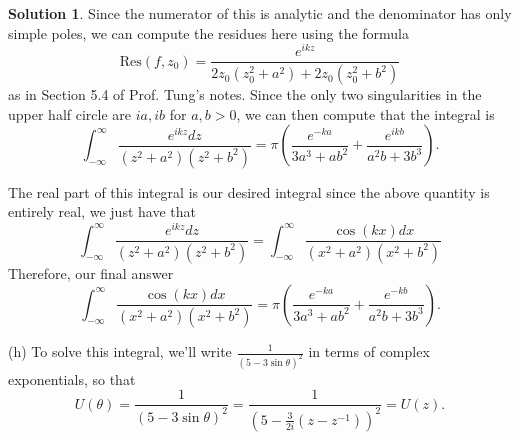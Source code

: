 \documentclass[12pt]{article}
\newcommand{\Res}{\text{Res}}
\theoremstyle{definition}
\newtheorem{sol}{Solution}
\theoremstyle{remark}
\begin{document}
\begin{sol}
Since the numerator of this is analytic and the denominator has only simple poles, we can compute the residues here using the formula
\begin{equation}
    \Res(f, z_0) = \frac{e^{ikz}}{2z_0(z_0^2 + a^2) + 2z_0 (z_0^2 + b^2)}
\end{equation}
as in Section 5.4 of Prof. Tung's notes. Since the only two singularities in the upper half circle are $ia, ib$ for $a,b>0$, we can then compute that the integral is
\begin{equation}
    \int_{-\infty}^{\infty} \frac{e^{ikz}dz}{(z^2+a^2)(z^2+b^2)} = \pi \left( \frac{e^{-ka}}{3a^3 + ab^2} + \frac{e^{ikb}}{a^2b +3b^3} \right).
\end{equation}

The real part of this integral is our desired integral since the above quantity is entirely real, we just have that
\begin{equation}
    \int_{-\infty}^{\infty} \frac{e^{ikz}dz}{(z^2+a^2)(z^2+b^2)} = \int_{-\infty}^{\infty} \frac{\cos(kx) dx}{(x^2+a^2)(x^2+b^2)}
\end{equation}
Therefore, our final answer
\begin{equation}
    \int_{-\infty}^{\infty} \frac{\cos(kx) dx}{(x^2+a^2)(x^2+b^2)} = \pi \left( \frac{e^{-ka}}{3a^3 + ab^2} + \frac{e^{-kb}}{a^2b +3b^3} \right).
\end{equation}

\newpage
(h)  %
To solve this integral, we'll write $\frac{1}{(5-3\sin\theta)^2}$ in terms of complex exponentials, so that
\begin{equation}
    U(\theta) = \frac{1}{(5-3\sin\theta)^2} = \frac{1}{(5- \frac{3}{2i}  (z-z^{-1}))^2} = U(z) .
\end{equation}


\end{sol}
\end{document}
